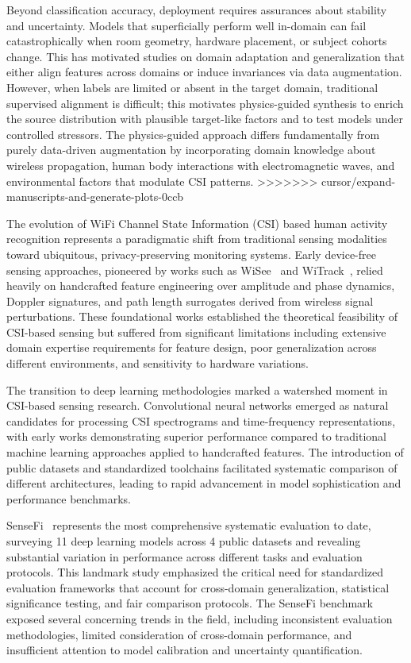 \documentclass[journal]{IEEEtran}
\begin{document}
Beyond classification accuracy, deployment requires assurances about stability and uncertainty. Models that superficially perform well in-domain can fail catastrophically when room geometry, hardware placement, or subject cohorts change. This has motivated studies on domain adaptation and generalization that either align features across domains or induce invariances via data augmentation. However, when labels are limited or absent in the target domain, traditional supervised alignment is difficult; this motivates physics-guided synthesis to enrich the source distribution with plausible target-like factors and to test models under controlled stressors. The physics-guided approach differs fundamentally from purely data-driven augmentation by incorporating domain knowledge about wireless propagation, human body interactions with electromagnetic waves, and environmental factors that modulate CSI patterns.
>>>>>>> cursor/expand-manuscripts-and-generate-plots-0ccb

The evolution of WiFi Channel State Information (CSI) based human activity recognition represents a paradigmatic shift from traditional sensing modalities toward ubiquitous, privacy-preserving monitoring systems. Early device-free sensing approaches, pioneered by works such as WiSee~\cite{pu2013whole} and WiTrack~\cite{adib2013see}, relied heavily on handcrafted feature engineering over amplitude and phase dynamics, Doppler signatures, and path length surrogates derived from wireless signal perturbations. These foundational works established the theoretical feasibility of CSI-based sensing but suffered from significant limitations including extensive domain expertise requirements for feature design, poor generalization across different environments, and sensitivity to hardware variations.

The transition to deep learning methodologies marked a watershed moment in CSI-based sensing research. Convolutional neural networks emerged as natural candidates for processing CSI spectrograms and time-frequency representations, with early works demonstrating superior performance compared to traditional machine learning approaches applied to handcrafted features. The introduction of public datasets and standardized toolchains facilitated systematic comparison of different architectures, leading to rapid advancement in model sophistication and performance benchmarks.

SenseFi~\cite{yang2023sensefi} represents the most comprehensive systematic evaluation to date, surveying 11 deep learning models across 4 public datasets and revealing substantial variation in performance across different tasks and evaluation protocols. This landmark study emphasized the critical need for standardized evaluation frameworks that account for cross-domain generalization, statistical significance testing, and fair comparison protocols. The SenseFi benchmark exposed several concerning trends in the field, including inconsistent evaluation methodologies, limited consideration of cross-domain performance, and insufficient attention to model calibration and uncertainty quantification.
\end{document}
